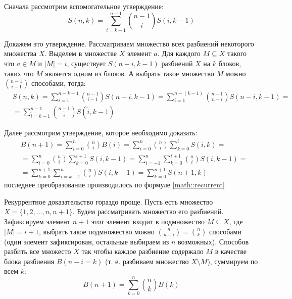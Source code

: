 \documentclass[a4paper,12pt]{article}
\begin{document}
\begin{Proof}
Сначала рассмотрим вспомогательное утверждение:
\begin{equation}
	S\left(n,k\right) = \sum_{i=k-1}^{n-1} \binom{n-1}{i} S\left(i, k-1\right)
	\label{math::recurrent}
\end{equation}

Докажем это утверждение. Рассматриваем множество всех разбиений некоторого множества $X$. Выделем в множестве $X$ элемент $a$. Для каждого $M \subseteq X$ такого что $a \in M$ и $\left|M\right|=i$, существует $S\left(n-i,k-1\right)$ разбиений $X$ на $k$ блоков, таких что $M$ является одним из блоков. А выбрать такое множество $M$ можно $\binom{n-1}{i-1}$ способами, тогда:
\[
\begin{split}
	& S\left(n,k\right) = \sum_{i=1}^{n-k+1} \binom{n-1}{i-1}S\left(n-i,k-1\right) = \sum_{i=1}^{n-\left(k-1\right)} \binom{n-1}{n-i}S\left(n-i,k-1\right) = \\
& = \sum_{\tilde i=k-1}^{n-1} \binom{n-1}{\tilde i} S\left(\tilde i,k-1\right)
\end{split}
\]

Далее рассмотрим утверждение, которое необходимо доказать:
\[
	\begin{split}
	& B\left(n+1\right) = \sum_{i=0}^n \binom{n}{i} B\left(i\right) = \sum_{i=0}^n \binom{n}{i} \sum_{k=0}^i S\left(i,k\right) = \\
	& = \sum_{i=0}^n \binom{n}{i} \sum_{k=0}^{i+1} S\left(i,k-1\right) = \sum_{i=-1}^n \sum_{k=0}^{i+1} \binom{n}{i} S\left(i,k-1\right) = \\
	& = \sum_{k=0}^{n+1} \sum_{i=k-1}^{n} \binom{n}{i} S\left(i,k-1\right) = \sum_{k=0}^{n+1} S \left(n+1,k\right)
	\end{split}
\]
последнее преобразование производилось по формуле \ref{math::recurrent}

Рекуррентное доказательство гораздо проще. Пусть есть множество $X = \{1,2,...,n,n+1\}$. Будем рассматривать множество его разбиений. Зафиксируем элемент $n+1$ этот элемент входит в подмножество $M \subseteq X$, где $\left|M\right|=i+1$, выбрать такое подмножество можно $\binom{n}{n-i} = \binom{n}{k}$ способами (один элемент зафиксирован, остальные выбираем из $n$ возможных). Способов разбить все множесто $X$ так чтобы каждое разбиение содержало $M$ в качестве блока разбиения $B\left(n-i=k\right)$ (т. е. разбиваем множество $X \setminus M$), суммируем по всем $k$:
\[
	B\left(n+1\right)=\sum_{k=0}^n \binom{n}{k} B\left(k\right)
\]
\end{Proof}
\end{document}
